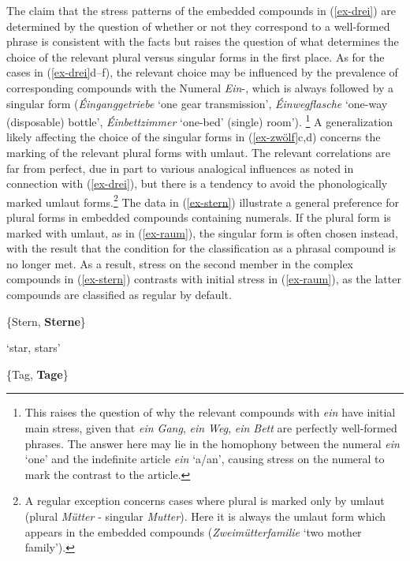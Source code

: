\documentclass[output=paper
 ,nobabel
 ,draftmode
 ,colorlinks, citecolor=brown
]{langscibook}
\begin{document}
The claim that the stress patterns of the embedded compounds in (\ref{ex-drei}) are determined by the question of whether or not they correspond to a well-formed phrase is consistent with the facts but 
raises the question of what determines the choice of the relevant plural versus singular forms in
the first place. As for the cases in (\ref{ex-drei}d--f), the relevant choice may be influenced by
the prevalence of corresponding compounds with the Numeral \emph{Ein}-, which is always followed by
a singular form (\eg \emph{Éinganggetriebe} `one gear transmission', \emph{Éinwegflasche} `one-way
(disposable) bottle', \emph{Éinbettzimmer} `one-bed' (single) room').%
%
\footnote{This raises the question of why the relevant compounds with \emph{ein} have initial main stress, given that \emph{ein Gang}, \emph{ein Weg}, \emph{ein Bett} are perfectly well-formed phrases. The answer here may lie in the homophony between the numeral \emph{ein} `one' and the indefinite article \emph{ein} `a/an', causing stress on the numeral to mark the contrast to the article.}
%
A generalization likely affecting the choice of the singular forms in (\ref{ex-zwölf}c,d) concerns the marking of the relevant plural forms with umlaut. The relevant
correlations are far from perfect, due in part to various analogical influences as noted in
connection with (\ref{ex-drei}), but there is a tendency to avoid the phonologically marked umlaut
forms.\footnote{A regular exception concerns cases where plural is marked only by umlaut (\eg plural
  \emph{Mütter} - singular \emph{Mutter}). Here it is always the umlaut form which appears in the
  embedded compounds (\eg \emph{Zweimütterfamilie} `two mother family').} The data in
(\ref{ex-stern}) illustrate a general preference for plural forms in embedded compounds containing
numerals. If the plural form is marked with umlaut, as in (\ref{ex-raum}), the singular form is often chosen instead, with the result that the condition for the classification as a phrasal compound is no longer met. As a result, stress on the second member in the complex compounds in (\ref{ex-stern}) contrasts with initial stress in (\ref{ex-raum}), as the latter compounds are classified as regular by default.


\ea\label{ex-stern}
\settowidth{}
\ea \{Stern, \textbf{Sterne}\} 

`star, stars' 

\ex \{Tag, \textbf{Tage}\} 
\end{document}
